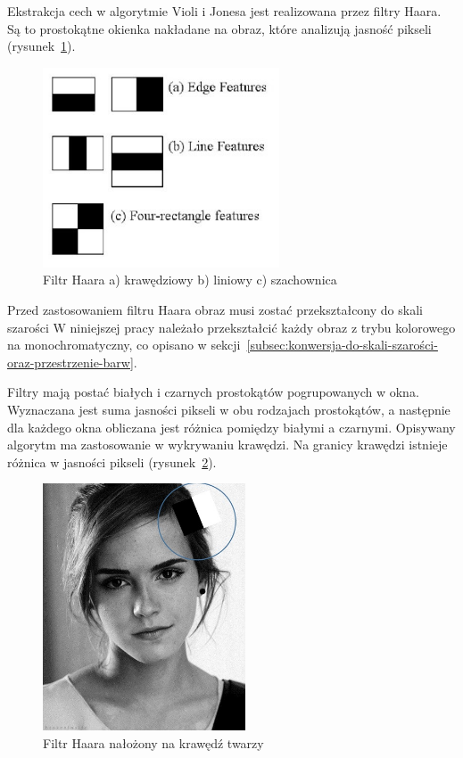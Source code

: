 \documentclass[a4paper,twoside,12pt]{book}
\begin{document}
    Ekstrakcja cech w algorytmie Violi i Jonesa jest realizowana przez filtry Haara.
    Są to prostokątne okienka
    nakładane na obraz, które analizują jasność pikseli (rysunek~\ref{fig.haarRectangles}).
    \begin{figure}
        \centering
        \includegraphics[width=7cm]{Obrazy/Haar_filter_rectangles.jpg}
        \caption{Filtr Haara a) krawędziowy b) liniowy c) szachownica~\cite{haar}}
        \label{fig.haarRectangles}
    \end{figure}

    Przed zastosowaniem filtru Haara obraz musi zostać przekształcony do skali szarości
    W niniejszej pracy należało przekształcić każdy obraz z trybu kolorowego na monochromatyczny, co opisano w sekcji~\ref{subsec:konwersja-do-skali-szarości-oraz-przestrzenie-barw}.

    Filtry mają postać białych i czarnych prostokątów pogrupowanych w okna. %
    Wyznaczana jest suma jasności pikseli w obu rodzajach prostokątów, a
    następnie dla każdego okna obliczana jest różnica pomiędzy białymi a czarnymi.
    Opisywany algorytm ma zastosowanie w wykrywaniu krawędzi.
    Na granicy krawędzi istnieje różnica w jasności pikseli
    (rysunek~\ref{fig.haarEmmaWatson}).

    \begin{figure}
        \centering
        \includegraphics[width=6cm]{Obrazy/haarEmmaWatson.jpg}
        \caption{Filtr Haara nałożony na krawędź twarzy~\cite{haar}}
        \label{fig.haarEmmaWatson}
    \end{figure}
\end{document}
